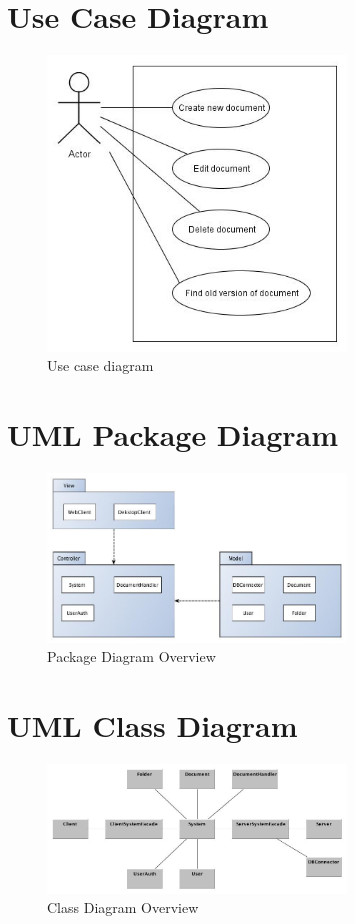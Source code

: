 \documentclass[11pt,a4paper]{article}
\begin{document}
\section{Use Case Diagram}
	\begin{figure}[H]
  		\centering
    	\includegraphics[width=300px]{images/UseCaseDiagram.jpg}
    	\caption{Use case diagram}
	\end{figure}

\section{UML Package Diagram}
	\begin{figure}[H]
  		\centering
    	\includegraphics[width=300px]{images/PackageDiagramOverview.jpg}
    	\caption{Package Diagram Overview}
	\end{figure}

\section{UML Class Diagram}
	\begin{figure}[H]
  		\centering
    	\includegraphics[width=300px]{images/ClassDiagramFirstDraft.jpg}
    	\caption{Class Diagram Overview}
	\end{figure}
\end{document}
